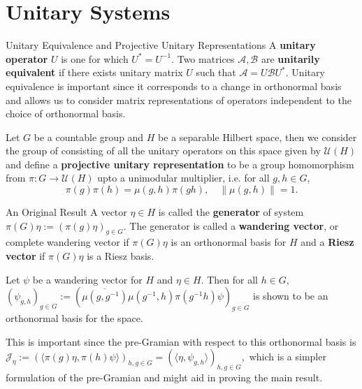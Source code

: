 \documentclass{beamer}
\begin{document}
\section{Unitary Systems}

\begin{frame}{Unitary Equivalence and Projective Unitary Representations}
    A \textbf{unitary operator} $U$ is one for which $U^* = U^{-1}$. Two matrices $\mathcal{A}, \mathcal{B}$ are \textbf{unitarily equivalent} if there exists unitary matrix $U$ such that $\mathcal{A} = U\mathcal{B}U^*$. Unitary equivalence is important since it corresponds to a change in orthonormal basis and allows us to consider matrix representations of operators independent to the choice of orthonormal basis.
    
    Let $G$ be a countable group and $H$ be a separable Hilbert space, then we consider the group of consisting of all the unitary operators on this space given by $\mathcal{U}(H)$ and define a \textbf{projective unitary representation} to be a group homomorphism from $\pi: G \to \mathcal{U}(H)$ upto a unimodular multiplier, i.e. for all $g, h \in G$,
    $$\pi(g)\pi(h) = \mu(g,h)\pi(gh), \quad \| \mu(g,h) \| = 1.$$

    
\end{frame}


\begin{frame}{An Original Result}
A vector $\eta\in H$ is called the \textbf{generator} of system $\pi(G)\eta:=(\pi(g)\eta)_{g\in G}$. The generator is called a \textbf{wandering vector}, or complete wandering vector if $\pi(G)\eta$ is an orthonormal basis for $H$ and a \textbf{Riesz vector} if $\pi(G)\eta$ is a Riesz basis.

    Let $\psi$ be a wandering vector for $H$ and $\eta\in H$.
Then for all  $h\in G$, $(\psi_{g,h})_{g\in G}
:=(\overline{\mu(g,g^{-1})}\mu(g^{-1},h)\pi(g^{-1}h)\psi)_{g\in G}$ is shown to be an orthonormal basis for the space. 

This is important since the pre-Gramian with respect to this orthonormal basis is $\mathcal{J}_{\eta}:=(\langle\pi(g)\eta,\pi(h)\psi\rangle)_{h,g\in G}=
(\langle\eta,\psi_{g,h}\rangle)_{h,g\in G},$ which is a simpler formulation of the pre-Gramian and might aid in proving the main result.
\end{frame}
\end{document}
